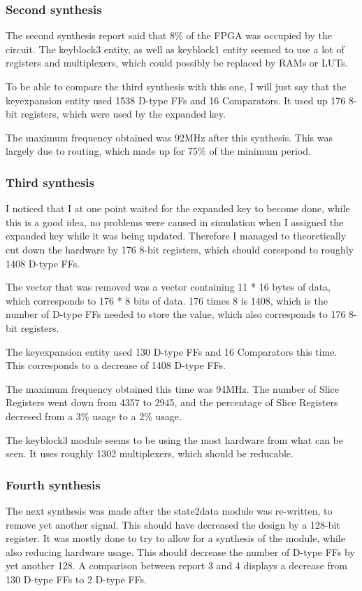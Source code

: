 \subsubsection{Second synthesis}
The second synthesis report said that 8\% of the FPGA was occupied by 
the circuit. The keyblock3 entity, as well as keyblock1 entity seemed 
to use a lot of registers and multiplexers, which could possibly be 
replaced by RAMs or LUTs.

To be able to compare the third synthesis with this one, I will just say
that the keyexpansion entity used 1538 D-type FFs and 16 Comparators.
It used up 176 8-bit registers, which were used by the expanded key.

The maximum frequency obtained was 92MHz after this synthesis. This 
was largely due to routing, which made up for 75\% of the minimum 
period.

\subsubsection{Third synthesis}
I noticed that I at one point waited for the expanded key to become done,
while this is a good idea, no problems were caused in simulation when I 
assigned the expanded key while it was being updated. Therefore I managed
to theoretically cut down the hardware by 176 8-bit registers, which should 
corespond to roughly 1408 D-type FFs. 

The vector that was removed was a vector containing 11 * 16 bytes of data, 
which corresponds to 176 * 8 bits of data. 176 times 8 is 1408, which is 
the number of D-type FFs needed to store the value, which also corresponds 
to 176 8-bit registers.

The keyexpansion entity used 130 D-type FFs and 16 Comparators this time.
This corresponds to a decrease of 1408 D-type FFs.

The maximum frequency obtained this time was 94MHz. The number of 
Slice Registers went down from 4357 to 2945, and the percentage of Slice 
Registers decresed from a 3\% usage to a 2\% usage.

The keyblock3 module seems to be using the most hardware from what can be 
seen. It uses roughly 1302 multiplexers, which should be reducable.

\subsubsection{Fourth synthesis}
The next synthesis was made after the state2data module was re-written, to 
remove yet another signal. This should have decreased the design by 
a 128-bit register. It was mostly done to try to allow for a synthesis of 
the module, while also reducing hardware usage. This should decrease the 
number of D-type FFs by yet another 128. A comparison between report 3 and 
4 displays a decrease from 130 D-type FFs to 2 D-type FFs.

